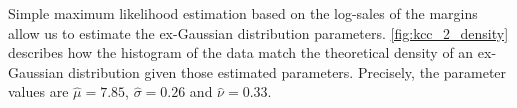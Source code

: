
Simple maximum likelihood estimation based on the log-sales of the margins allow us to estimate the ex-Gaussian distribution parameters. \autoref{fig:kcc_2_density} describes how the histogram of the data match the theoretical density of an ex-Gaussian distribution given those estimated parameters. Precisely, the parameter values are $\hat{\mu} = 7.85$, $\hat{\sigma} = 0.26$ and $\hat{\nu} = 0.33$.
\\










